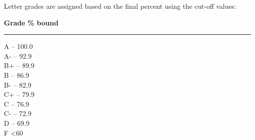 Letter grades are assigned based on the final percent using the cut-off values:

\begin{flushleft}
\textbf{Grade} \hfill \textbf{\% bound} \\
\vspace{.1in}

 \hrule 
 \vspace{.1in}
A  -- 100.0 \\


A-  -- 92.9 \\

B+  -- 89.9 \\

B  -- 86.9 \\

B-  -- 82.9 \\

C+  -- 79.9 \\

C  -- 76.9 \\

C-  -- 72.9 \\

D  -- 69.9 \\

F \dotfill <60 \\

\end{flushleft}
